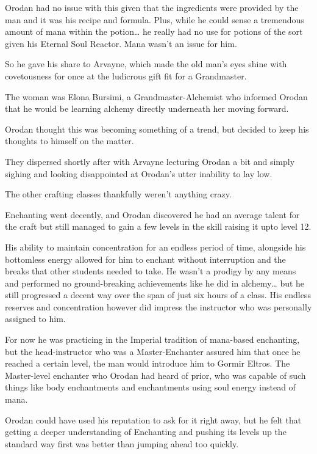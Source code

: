 \documentclass[a4paper,10pt]{book}
\begin{document}
Orodan had no issue with this given that the ingredients were provided by the man and it was his recipe and formula. Plus, while he could sense a tremendous amount of mana within the potion… he really had no use for potions of the sort given his Eternal Soul Reactor. Mana wasn't an issue for him.\par
So he gave his share to Arvayne, which made the old man’s eyes shine with covetousness for once at the ludicrous gift fit for a Grandmaster.\par
The woman was Elona Bursimi, a Grandmaster-Alchemist who informed Orodan that he would be learning alchemy directly underneath her moving forward.\par
Orodan thought this was becoming something of a trend, but decided to keep his thoughts to himself on the matter.\par
They dispersed shortly after with Arvayne lecturing Orodan a bit and simply sighing and looking disappointed at Orodan’s utter inability to lay low.\par
The other crafting classes thankfully weren’t anything crazy.\par
Enchanting went decently, and Orodan discovered he had an average talent for the craft but still managed to gain a few levels in the skill raising it upto level 12.\par
His ability to maintain concentration for an endless period of time, alongside his bottomless energy allowed for him to enchant without interruption and the breaks that other students needed to take. He wasn’t a prodigy by any means and performed no ground-breaking achievements like he did in alchemy… but he still progressed a decent way over the span of just six hours of a class. His endless reserves and concentration however did impress the instructor who was personally assigned to him.\par
For now he was practicing in the Imperial tradition of mana-based enchanting, but the head-instructor who was a Master-Enchanter assured him that once he reached a certain level, the man would introduce him to Gormir Eltros. The Master-level enchanter who Orodan had heard of prior, who was capable of such things like body enchantments and enchantments using soul energy instead of mana.\par
Orodan could have used his reputation to ask for it right away, but he felt that getting a deeper understanding of Enchanting and pushing its levels up the standard way first was better than jumping ahead too quickly.\par
\end{document}
